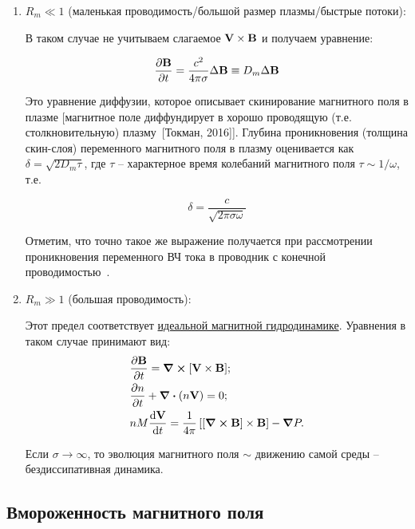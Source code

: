 \documentclass[10pt, a4paper]{article}
\newcommand{\Tokman}{~[Токман, 2016]}
\begin{document}
\begin{enumerate}
	
	\item $R_m \ll 1$ (маленькая проводимость/большой размер плазмы/быстрые потоки):
	
	В таком случае не учитываем слагаемое $\vb{V}\times\vb{B}$ и получаем уравнение:
	
	\begin{equation*}
		\pdv{\vb{B}}{t} = \frac{c^2}{4\pi\sigma}\Delta\vb{B} \equiv D_m\Delta\vb{B}
	\end{equation*}

	Это уравнение диффузии, которое описывает скинирование магнитного поля в плазме [магнитное поле диффундирует в хорошо проводящую (т.е. столкновительную) плазму\Tokman].
	Глубина проникновения (толщина скин-слоя) переменного магнитного поля в плазму оценивается как $\delta = \sqrt{2D_m\tau}$, где $\tau$ -- характерное время колебаний магнитного поля $\tau\sim 1/\omega$, т.е.
	
	\begin{equation*}
		\delta = \frac{c}{\sqrt{2\pi\sigma\omega}}
	\end{equation*}

	Отметим, что точно такое же выражение получается при рассмотрении проникновения переменного ВЧ тока в проводник с конечной проводимостью~\cite{kotelnikov}.
		
	\item $R_m \gg 1$ (большая проводимость):
	
	Этот предел соответствует \uline{идеальной магнитной гидродинамике}. Уравнения в таком случае принимают вид:
	\begin{align}
		\label{eq:iMGD_B} &\pdv{\vb{B}}{t} = \curl{[\vb{V}\times\vb{B}]}; \\
		&\pdv{n}{t} + \divergence{\left( n\vb{V} \right)} = 0;\\
		\label{eq:iMGD_motion} &n M \dv{\vb{V}}{t} = \frac{1}{4\pi}\left[\left[\curl{\vb{B}} \right]\times\vb{B}\right]-\grad{P}.
	\end{align}

	Если $\sigma\rightarrow\infty$, то эволюция магнитного поля $\sim$ движению самой среды -- бездиссипативная динамика.
	
\end{enumerate}

\subsection{Вмороженность магнитного поля} \label{subsec:Alfven_th}
\end{document}
